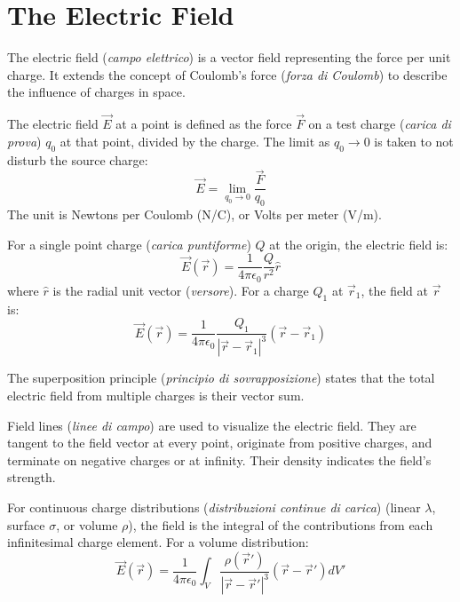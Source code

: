 \section{The Electric Field}

The electric field (\textit{campo elettrico}) is a vector field representing the force per unit charge. It extends the concept of Coulomb's force (\textit{forza di Coulomb}) to describe the influence of charges in space.

The electric field \(\vec{E}\) at a point is defined as the force \(\vec{F}\) on a test charge (\textit{carica di prova}) \(q_0\) at that point, divided by the charge. The limit as \(q_0 \to 0\) is taken to not disturb the source charge:
\begin{equation}
    \vec{E} = \lim_{q_0 \to 0} \frac{\vec{F}}{q_0}
\end{equation}
The unit is Newtons per Coulomb (N/C), or Volts per meter (V/m).

For a single point charge (\textit{carica puntiforme}) \(Q\) at the origin, the electric field is:
\begin{equation}
    \vec{E}(\vec{r}) = \frac{1}{4\pi\epsilon_0} \frac{Q}{r^2} \hat{r}
\end{equation}
where \(\hat{r}\) is the radial unit vector (\textit{versore}). For a charge \(Q_1\) at \(\vec{r}_1\), the field at \(\vec{r}\) is:
\begin{equation}
    \vec{E}(\vec{r}) = \frac{1}{4\pi\epsilon_0} \frac{Q_1}{|\vec{r} - \vec{r}_1|^3} (\vec{r} - \vec{r}_1)
\end{equation}

The superposition principle (\textit{principio di sovrapposizione}) states that the total electric field from multiple charges is their vector sum.

Field lines (\textit{linee di campo}) are used to visualize the electric field. They are tangent to the field vector at every point, originate from positive charges, and terminate on negative charges or at infinity. Their density indicates the field's strength.

For continuous charge distributions (\textit{distribuzioni continue di carica}) (linear \(\lambda\), surface \(\sigma\), or volume \(\rho\)), the field is the integral of the contributions from each infinitesimal charge element. For a volume distribution:
\begin{equation}
    \vec{E}(\vec{r}) = \frac{1}{4\pi\epsilon_0} \int_V \frac{\rho(\vec{r}')}{|\vec{r} - \vec{r}'|^3} (\vec{r} - \vec{r}') dV'
\end{equation}

